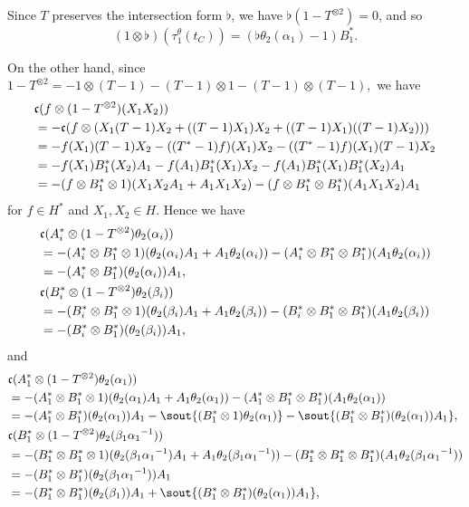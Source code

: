 \documentclass[a4paper,12pt, twoside]{amsart}
\theoremstyle{definition}
\theoremstyle{remark}
\numberwithin{equation}{section}
\newcommand\inv{^{-1}}
\begin{document}
\par
Since $T$ preserves the intersection form $\flat$, we have $\flat(1 - T^{\otimes 2}) = 0$, and so 
\begin{equation}\label{eq:nutautC}
(1\otimes\flat)(\tau^\theta_1(t_C))
= (\flat\theta_2(\alpha_1) -1)B^*_1.
\end{equation}

On the other hand, since
$
1- T^{\otimes 2} %
= - 1\otimes (T-1) -(T-1)\otimes 1 - (T-1)\otimes(T-1), 
$
we have 
$$
\aligned
&\mathfrak{c}(f\otimes(1-T^{\otimes 2})(X_1X_2))\\
&=-\mathfrak{c}(f\otimes (X_1(T-1)X_2+((T-1)X_1)X_2 + ((T-1)X_1)((T-1)X_2)))\\
&= -f(X_1)(T-1)X_2 - ((T^*-1)f)(X_1)X_2 - ((T^*-1)f)(X_1)(T-1)X_2\\
&= -f(X_1)B^*_1(X_2)A_1 - f(A_1)B^*_1(X_1)X_2 
- f(A_1)B^*_1(X_1)B^*_1(X_2)A_1\\
&= -(f\otimes B^*_1\otimes 1)(X_1X_2A_1+A_1X_1X_2) 
- (f\otimes B^*_1\otimes B^*_1)(A_1X_1X_2)A_1
\endaligned
$$
for $f \in H^*$ and $X_1, X_2 \in H$. 
Hence we have 
$$
\aligned
& \mathfrak{c}(A^*_i\otimes  (1 - T^{\otimes 2})\theta_2(\alpha_i))\\
& = -(A^*_i\otimes B^*_1\otimes 1)(\theta_2(\alpha_i)A_1 + A_1\theta_2(\alpha_i))
- (A^*_i\otimes B^*_1\otimes B^*_1)(A_1\theta_2(\alpha_i))\\
&= -(A^*_i\otimes B^*_1)(\theta_2(\alpha_i))A_1,\\
& \mathfrak{c}(B^*_i\otimes  (1 - T^{\otimes 2})\theta_2(\beta_i))\\
& = -(B^*_i\otimes B^*_1\otimes 1)(\theta_2(\beta_i)A_1 + A_1\theta_2(\beta_i))
- (B^*_i\otimes B^*_1\otimes B^*_1)(A_1\theta_2(\beta_i))\\
&= -(B^*_i\otimes B^*_1)(\theta_2(\beta_i))A_1,
\endaligned
$$
and
$$
\aligned
& \mathfrak{c}(A^*_1\otimes  (1 - T^{\otimes 2})\theta_2(\alpha_1))\\
& = -(A^*_1\otimes B^*_1\otimes 1)(\theta_2(\alpha_1)A_1 + A_1\theta_2(\alpha_1))
- (A^*_1\otimes B^*_1\otimes B^*_1)(A_1\theta_2(\alpha_1))\\
&= -(A^*_1\otimes B^*_1)(\theta_2(\alpha_1))A_1
- \sout{(B^*_1\otimes 1)\theta_2(\alpha_1)} - \sout{(B^*_1\otimes B^*_1)(\theta_2(\alpha_1))A_1},\\
& \mathfrak{c}(B^*_1\otimes  (1 - T^{\otimes 2})\theta_2(\beta_1{\alpha_1}\inv))\\
& = -(B^*_1\otimes B^*_1\otimes 1)(\theta_2(\beta_1{\alpha_1}\inv)A_1 + A_1\theta_2(\beta_1{\alpha_1}\inv))
- (B^*_1\otimes B^*_1\otimes B^*_1)(A_1\theta_2(\beta_1{\alpha_1}\inv))\\
&= -(B^*_1\otimes B^*_1)(\theta_2(\beta_1{\alpha_1}\inv))A_1\\
&= -(B^*_1\otimes B^*_1)(\theta_2(\beta_1))A_1+ \sout{(B^*_1\otimes B^*_1)(\theta_2(\alpha_1))A_1},
\endaligned
$$
\end{document}
